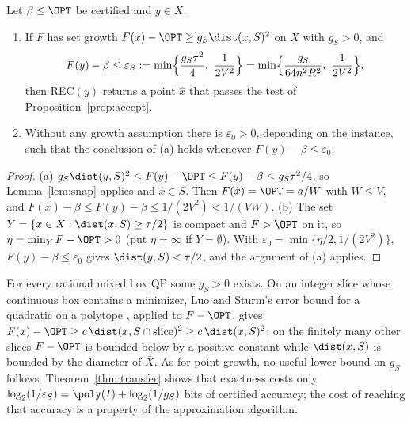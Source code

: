 \begin{theorem}\label{thm:transfer}
Let $\beta\le\OPT$ be certified and $y\in X$.
\begin{enumerate}[label=(\alph*)]
\item If $F$ has set growth $F(x)-\OPT\ge g_S\dist(x,S)^2$ on $X$ with
$g_S>0$, and
\begin{equation}\label{eq:transfer-threshold}
F(y)-\beta\le\varepsilon_S:=\min\Bigl\{\frac{g_S\tau^2}{4},\
\frac1{2V^2}\Bigr\}
=\min\Bigl\{\frac{g_S}{64n^2R^2},\ \frac1{2V^2}\Bigr\},
\end{equation}
then REC$(y)$ returns a point $\hat x$ that passes the test of
Proposition~\ref{prop:accept}.
\item Without any growth assumption there is $\varepsilon_0>0$, depending on
the instance, such that the conclusion of (a) holds whenever
$F(y)-\beta\le\varepsilon_0$.
\end{enumerate}
\end{theorem}

\begin{proof}
(a) $g_S\dist(y,S)^2\le F(y)-\OPT\le F(y)-\beta\le g_S\tau^2/4$, so
Lemma~\ref{lem:snap} applies and $\hat x\in S$. Then
$F(\hat x)=\OPT=a/W$ with $W\le V$, and
$F(\hat x)-\beta\le F(y)-\beta\le1/(2V^2)<1/(VW)$.
(b) The set $Y=\{x\in X:\dist(x,S)\ge\tau/2\}$ is compact and $F>\OPT$ on
it, so $\eta=\min_YF-\OPT>0$ (put $\eta=\infty$ if $Y=\emptyset$). With
$\varepsilon_0=\min\{\eta/2,1/(2V^2)\}$, $F(y)-\beta\le\varepsilon_0$ gives
$\dist(y,S)<\tau/2$, and the argument of (a) applies.
\end{proof}

\begin{remark}\label{rem:setgrowth}
For every rational mixed box QP some $g_S>0$ exists. On an integer slice
whose continuous box contains a minimizer, Luo and Sturm's error bound for a
quadratic on a polytope \cite[Theorem~3.3]{LuoSturm2000}, applied to $F-\OPT$,
gives $F(x)-\OPT\ge c\,\dist(x,S\cap\text{slice})^2\ge c\,\dist(x,S)^2$; on
the finitely many other slices $F-\OPT$ is bounded below by a positive
constant while $\dist(x,S)$ is bounded by the diameter of $\bar X$. As for
point growth, no useful lower bound on $g_S$ follows. Theorem~\ref{thm:transfer}
shows that exactness costs only $\log_2(1/\varepsilon_S)
=\poly(I)+\log_2(1/g_S)$ bits of certified accuracy; the cost of reaching that
accuracy is a property of the approximation algorithm.
\end{remark}


